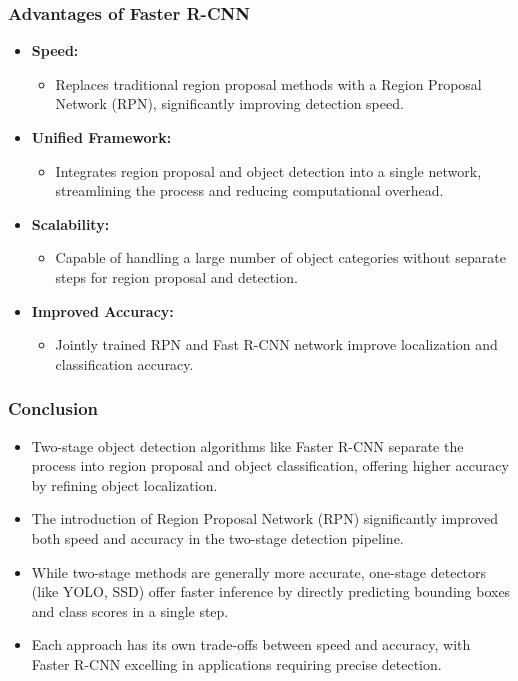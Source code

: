 \documentclass{beamer}
\begin{document}
\begin{frame}
    \frametitle{Advantages of Faster R-CNN}
    
    \begin{itemize}
        \item \textbf{Speed:} 
        \begin{itemize}
            \item Replaces traditional region proposal methods with a Region Proposal Network (RPN), significantly improving detection speed.
        \end{itemize}
        
        \item \textbf{Unified Framework:} 
        \begin{itemize}
            \item Integrates region proposal and object detection into a single network, streamlining the process and reducing computational overhead.
        \end{itemize}
        
        \item \textbf{Scalability:} 
        \begin{itemize}
            \item Capable of handling a large number of object categories without separate steps for region proposal and detection.
        \end{itemize}
        
        \item \textbf{Improved Accuracy:} 
        \begin{itemize}
            \item Jointly trained RPN and Fast R-CNN network improve localization and classification accuracy.
        \end{itemize}
    \end{itemize}
    
\end{frame}


\begin{frame}
    \frametitle{Conclusion}

    \begin{itemize}
        \item Two-stage object detection algorithms like Faster R-CNN separate the process into region proposal and object classification, offering higher accuracy by refining object localization.
        \item The introduction of Region Proposal Network (RPN) significantly improved both speed and accuracy in the two-stage detection pipeline.
        \item While two-stage methods are generally more accurate, one-stage detectors (like YOLO, SSD) offer faster inference by directly predicting bounding boxes and class scores in a single step.
        \item Each approach has its own trade-offs between speed and accuracy, with Faster R-CNN excelling in applications requiring precise detection.
    \end{itemize}
    
\end{frame}
\end{document}
